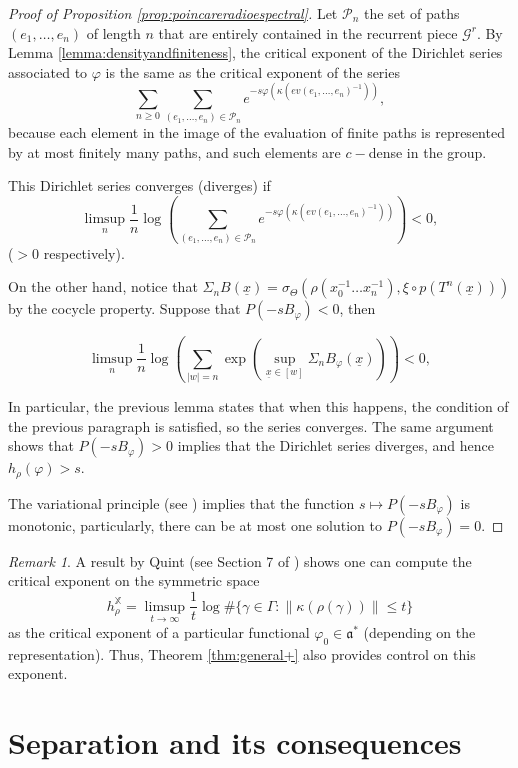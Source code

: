 \documentclass{amsart}
\theoremstyle{remark}
\newtheorem{rmk}[thm]{Remark}
\theoremstyle{definition}
\begin{document}
\begin{proof}[Proof of Proposition \ref{prop:poincareradioespectral}]
 Let $\mathcal{P}_n$ the set of paths $(e_1,\ldots,e_n)$ of length $n$ that are entirely contained in the recurrent piece $\mathcal{G}^r$.
 By Lemma \ref{lemma:densityandfiniteness}, the critical exponent of the Dirichlet series associated to $\varphi$ is the same as the critical exponent of the series
   $$\sum_{n \geq 0} \sum_{(e_1,\ldots,e_n) \in \mathcal{P}_n} e^{-s \varphi (\kappa (ev(e_1,\ldots,e_n)^{-1}))},$$
 because each element in the image of the evaluation of finite paths is represented by at most finitely many paths, and such elements are $c-$dense in the group.

 This Dirichlet series converges (diverges) if 
 $$\limsup_n \frac{1}{n} \log \left( \sum_{(e_1,\ldots,e_n) \in \mathcal{P}_n} e^{-s \varphi (\kappa (ev(e_1,\ldots,e_n)^{-1}))} \right) <0,$$
 ($>0$ respectively).

 On the other hand, notice that $\Sigma_n B (\underline{x}) = \sigma_\Theta (\rho (x_0^{-1}\ldots x_n^{-1}), \xi \circ p (T^n (\underline{x})))$ by the cocycle property.
 Suppose that $P(-s B_\varphi) <0$, then

   $$\limsup_n \frac{1}{n} \log \left( \sum_{|w| = n} \exp\left(\sup_{\underline{x} \in [w]}\Sigma_n B_\varphi(\underline{x})\right) \right) <0,$$

 In particular, the previous lemma states that when this happens, the condition of the previous paragraph is satisfied, so the series converges.
 The same argument shows that $P(-s B_\varphi) >0$ implies that the Dirichlet series diverges, and hence $h_\rho(\varphi) > s$.

 The variational principle (see \cite[Theorem 10.4.1]{viana2016foundations}) implies that the function $s \mapsto P(-s B_\varphi)$ is monotonic, particularly, there can be at most one solution to $P(-sB_\varphi) =0$.
\end{proof}

\begin{rmk}
A result by Quint (see Section 7 of \cite{quint2002patterson}) shows one can compute the critical exponent on the symmetric space 
  $$h^\mathbb{X}_\rho = \limsup_{t \to \infty}\frac{1}{t}\log\#\{\gamma \in \Gamma: \|\kappa(\rho(\gamma))\| \le t\}$$
   as the critical exponent of a particular functional $\varphi_0 \in \mathfrak{a}^*$ (depending on the representation). Thus, Theorem \ref{thm:general+} also provides control on this exponent. 
\end{rmk}
\section{Separation and its consequences}
\label{sec:proof}
\end{document}
